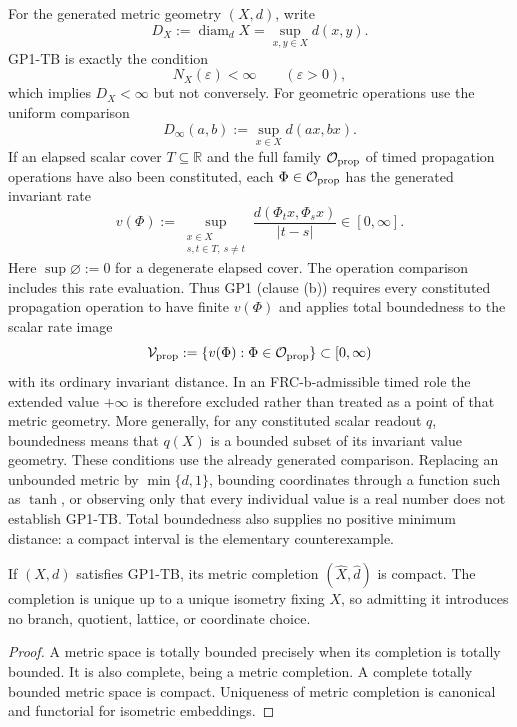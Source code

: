 \documentclass[12pt,a4paper]{article}
\begin{document}
\begin{definition}
\label{p2:def:intrinsic-operational-boundedness}
For the generated metric geometry \((X,d)\), write
\[
 D_X:=\operatorname{diam}_dX
     =\sup_{x,y\in X}d(x,y).
\]
GP1-TB is exactly the condition
\[
 N_X(\varepsilon)<\infty\qquad(\varepsilon>0),
\]
which implies \(D_X<\infty\) but not conversely.  For geometric operations use
the uniform comparison
\[
 D_\infty(a,b):=\sup_{x\in X}d(ax,bx).
\]
If an elapsed scalar cover \(T\subseteq\mathbb R\) and the full family
\(\mathcal O_{\rm prop}\) of timed propagation operations have also been
constituted, each \(\Phi\in\mathcal O_{\rm prop}\) has the generated invariant
rate
\[
 v(\Phi)
 :=
 \sup_{\substack{x\in X\\s,t\in T,\ s\ne t}}
 \frac{d(\Phi_t x,\Phi_s x)}{|t-s|}
 \in[0,\infty].
\]
Here \(\sup\varnothing:=0\) for a degenerate elapsed cover.
The operation comparison includes this rate evaluation.  Thus GP1
(clause (b)) requires
every constituted propagation operation to have finite \(v(\Phi)\) and
applies total boundedness to the scalar rate image
\[
 \mathcal V_{\rm prop}
 :=\{v(\Phi):\Phi\in\mathcal O_{\rm prop}\}
 \subset[0,\infty)
\]
with its ordinary invariant distance.  In an FRC-b-admissible timed role the
extended value \(+\infty\) is therefore excluded rather than treated as a
point of that metric geometry.  More generally, for any constituted
scalar readout \(q\), boundedness means that \(q(X)\) is a bounded subset of
its invariant value geometry.  These conditions use the already generated
comparison.  Replacing an
unbounded metric by \(\min\{d,1\}\), bounding coordinates through a function
such as \(\tanh\), or observing only that every individual value is a real
number does not establish GP1-TB.  Total boundedness also supplies no positive
minimum distance: a compact interval is the elementary counterexample.
\end{definition}

\begin{theorem}
\label{p2:thm:gp1-bounded-compactness}
If \((X,d)\) satisfies GP1-TB, its metric
completion \((\widehat X,\widehat d)\) is compact.  The completion is unique up
to a unique isometry fixing \(X\), so admitting it introduces no branch,
quotient, lattice, or coordinate choice.
\end{theorem}

\begin{proof}
A metric space is totally bounded precisely when its completion is totally
bounded.  It is also complete, being a metric completion.  A complete totally
bounded metric space is compact.  Uniqueness of
metric completion is canonical and functorial for isometric embeddings.
\end{proof}
\end{document}
